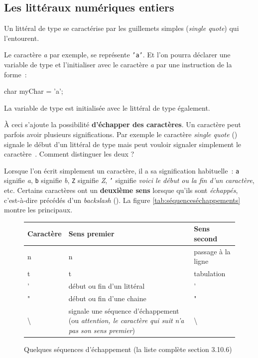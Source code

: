 \subsection{Les littéraux numériques entiers }

Un littéral de type  se caractérise par les guillemets simples
(\textit{single quote}) qui l'entourent. 

Le caractère \textit{a} par exemple, se représente \texttt{'a'}. Et l'on pourra
déclarer une variable de type  et l'initialiser avec le caractère
\textit{a} par une instruction de la forme~:

\begin{java}
	char myChar = 'a';
\end{java}

La variable  de type  est initialisée avec le littéral
 de type  également. 


\clearpage
{}
À ceci s'ajoute la possibilité \textbf{d'échapper des caractères}. Un caractère
peut parfois avoir plusieurs significations. Par exemple le caractère
\textit{single quote} () signale le début d'un littéral de type 
mais peut vouloir signaler simplement le caractère~.   
Comment distinguer les deux ?

Lorsque l'on écrit simplement un caractère, il a sa signification habituelle~: 
\texttt{a} signifie \textit{a},
\texttt{b} signifie \textit{b},
\texttt{Z} signifie \textit{Z},
\texttt{'} signifie \textit{voici le début ou la fin d'un caractère}, etc. 
Certains caractères ont un \textbf{deuxième sens} lorsque qu'ils sont 
\textit{échappés}, c'est-à-dire précédés d'un \textit{backslash} 
(\pc{\textbackslash}). La figure \vref{tab:séquenceséchappements} montre les 
principaux.

\begin{figure}[h]
	\centering
	\begin{tabular}[h]{|l|p{6cm}|l|}
		\hline
		\rowcolor{black!20}
		\textbf{Caractère}	&	\textbf{Sens premier}	& \textbf{Sens second}	\\
		\hline
		n					&	n						& passage à la ligne	\\
		t					&	t						& tabulation		\\
		'					&	début ou fin d'un littéral \pc{char}	
														&	'	\\
		"					& 	début ou fin d'une chaine 	
														&	"	\\
		\textbackslash		& 	signale une séquence d'échappement 
								(ou \textit{attention, le caractère qui suit 
								n'a pas son sens premier}) 	
														&	\textbackslash	\\
		\hline
	\end{tabular}
	\caption{Quelques séquences d'échappement (la liste complète \cite{jls9} section 3.10.6)}
	\label{tab:séquenceséchappements}
\end{figure}



